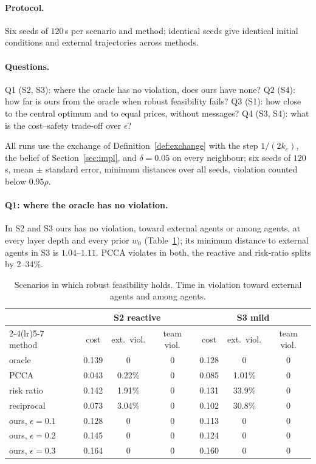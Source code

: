 \documentclass[11pt]{article}
\theoremstyle{definition}
\theoremstyle{remark}
\begin{document}
\paragraph{Protocol.} Six seeds of $120$\,s per scenario and method; identical seeds give identical initial conditions and external trajectories across methods.

\paragraph{Questions.} Q1 (S2, S3): where the oracle has no violation, does ours have none? Q2 (S4): how far is ours from the oracle when robust feasibility fails? Q3 (S1): how close to the central optimum and to equal prices, without messages? Q4 (S3, S4): what is the cost--safety trade-off over $\epsilon$?

All runs use the exchange of Definition~\ref{def:exchange} with the step $1/(2k_e)$, the belief of Section~\ref{sec:impl}, and $\delta=0.05$ on every neighbour; six seeds of $120$\,s, mean $\pm$ standard error, minimum distances over all seeds, violation counted below $0.95\rho$.

\paragraph{Q1: where the oracle has no violation.} In S2 and S3 ours has no violation, toward external agents or among agents, at every layer depth and every prior $w_0$ (Table~\ref{tab:s23}); its minimum distance to external agents in S3 is $1.04$--$1.11$. PCCA violates in both, the reactive and risk-ratio splits by 2--34\%.

\begin{table}[h]
\centering\small
\begin{tabular}{lcccccc}
\toprule
 & \multicolumn{3}{c}{S2 reactive} & \multicolumn{3}{c}{S3 mild}\\
\cmidrule(lr){2-4}\cmidrule(lr){5-7}
method & cost & ext.\ viol. & team viol. & cost & ext.\ viol. & team viol.\\
\midrule
oracle & 0.139 & 0 & 0 & 0.128 & 0 & 0\\
PCCA & 0.043 & 0.22\% & 0 & 0.085 & 1.01\% & 0\\
risk ratio & 0.142 & 1.91\% & 0 & 0.131 & 33.9\% & 0\\
reciprocal & 0.073 & 3.04\% & 0 & 0.102 & 30.8\% & 0\\
ours, $\epsilon=0.1$ & 0.128 & 0 & 0 & 0.113 & 0 & 0\\
ours, $\epsilon=0.2$ & 0.145 & 0 & 0 & 0.124 & 0 & 0\\
ours, $\epsilon=0.3$ & 0.164 & 0 & 0 & 0.160 & 0 & 0\\
\bottomrule
\end{tabular}
\caption{Scenarios in which robust feasibility holds. Time in violation toward external agents and among agents.}
\label{tab:s23}
\end{table}
\end{document}
